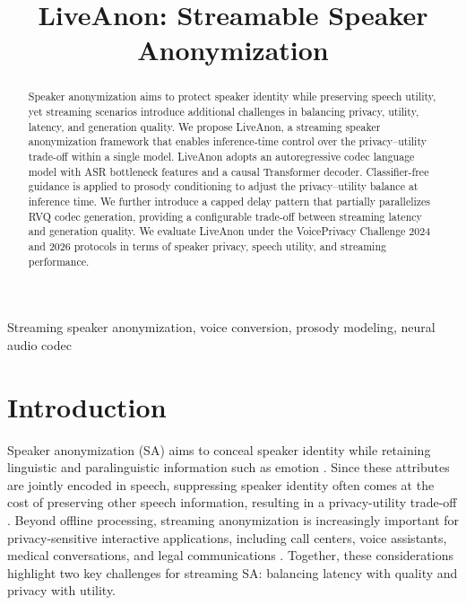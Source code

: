 \documentclass{article}
\title{LiveAnon: Streamable Speaker Anonymization}
\begin{document}
%
\maketitle
%
\begin{abstract}
Speaker anonymization aims to protect speaker identity while preserving speech utility, yet streaming scenarios introduce additional challenges in balancing privacy, utility, latency, and generation quality. We propose LiveAnon, a streaming speaker anonymization framework that enables inference-time control over the privacy--utility trade-off within a single model. LiveAnon adopts an autoregressive codec language model with ASR bottleneck features and a causal Transformer decoder. Classifier-free guidance is applied to prosody conditioning to adjust the privacy--utility balance at inference time. We further introduce a capped delay pattern that partially parallelizes RVQ codec generation, providing a configurable trade-off between streaming latency and generation quality. We evaluate LiveAnon under the VoicePrivacy Challenge 2024 and 2026 protocols in terms of speaker privacy, speech utility, and streaming performance.
\end{abstract}
%
\begin{keywords}
Streaming speaker anonymization, voice conversion, prosody modeling, neural audio codec 
\end{keywords}
%
\section{Introduction}
\label{sec:intro}

Speaker anonymization (SA) aims to conceal speaker identity while retaining linguistic and paralinguistic information such as emotion \cite{tomashenko2022voiceprivacy}. 
Since these attributes are jointly encoded in speech, suppressing speaker identity often comes at the cost of preserving other speech information, resulting in a privacy-utility trade-off \cite{zhang2023voicepm,cai2024privacy}. 
Beyond offline processing, streaming anonymization is increasingly important for privacy-sensitive interactive applications, including call centers, voice assistants, medical conversations, and legal communications \cite{meyer2025use}. 
Together, these considerations highlight two key challenges for streaming SA: balancing latency with quality and privacy with utility.
\end{document}
